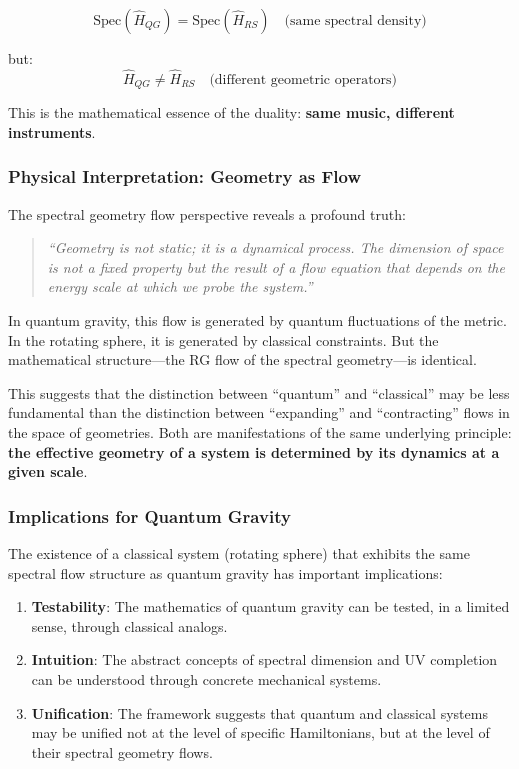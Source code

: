 \documentclass[12pt,a4paper]{article}
\begin{document}
\begin{equation}
    \text{Spec}(\hat{H}_{QG}) = \text{Spec}(\hat{H}_{RS}) \quad \text{(same spectral density)}
\end{equation}

but:
\begin{equation}
    \hat{H}_{QG} \neq \hat{H}_{RS} \quad \text{(different geometric operators)}
\end{equation}

This is the mathematical essence of the duality: \textbf{same music, different instruments}.

\subsubsection{Physical Interpretation: Geometry as Flow}

The spectral geometry flow perspective reveals a profound truth:

\begin{quote}
    \textit{``Geometry is not static; it is a dynamical process. The dimension of space is not a fixed property but the result of a flow equation that depends on the energy scale at which we probe the system.''}
\end{quote}

In quantum gravity, this flow is generated by quantum fluctuations of the metric. In the rotating sphere, it is generated by classical constraints. But the mathematical structure---the RG flow of the spectral geometry---is identical.

This suggests that the distinction between ``quantum'' and ``classical'' may be less fundamental than the distinction between ``expanding'' and ``contracting'' flows in the space of geometries. Both are manifestations of the same underlying principle: \textbf{the effective geometry of a system is determined by its dynamics at a given scale}.

\subsubsection{Implications for Quantum Gravity}

The existence of a classical system (rotating sphere) that exhibits the same spectral flow structure as quantum gravity has important implications:

\begin{enumerate}
    \item \textbf{Testability}: The mathematics of quantum gravity can be tested, in a limited sense, through classical analogs.
    \item \textbf{Intuition}: The abstract concepts of spectral dimension and UV completion can be understood through concrete mechanical systems.
    \item \textbf{Unification}: The framework suggests that quantum and classical systems may be unified not at the level of specific Hamiltonians, but at the level of their spectral geometry flows.
\end{enumerate}
\end{document}
